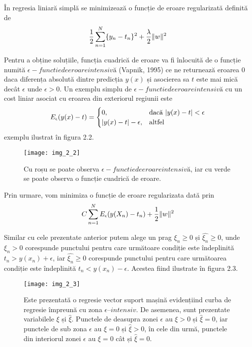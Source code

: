 În regresia liniară simplă se minimizează o funcție de eroare regularizată definită de
\begin{align}
	\frac{1}{2}\sum_{n=1}^{N}\{y_n-t_n\}^2+\frac{\lambda}{2}\lVert w\rVert^2
\end{align}

Pentru a obține soluțiile, funcția cuadrică de eroare va fi înlocuită de o funcție numită $\epsilon - functie de eroare intensivă$ (Vapnik, 1995) ce ne returnează eroarea 0 daca diferența absolută dintre predicția $y(x)$ și asocierea sa $t$ este mai mică decât $\epsilon$ unde $\epsilon > 0$. Un exemplu simplu de $\epsilon - functie de eroare intensivă$ cu un cost liniar asociat cu eroarea din exteriorul regiunii este
\begin{align}
	E_{\epsilon}(y(x) - t) = 
	\begin{cases}
	0,& \text{dacă } \lvert y(x) - t\rvert < \epsilon\\
	\lvert y(x) - t\rvert - \epsilon,              & \text{altfel}
	\end{cases}
\end{align}
exemplu ilustrat în figura 2.2.
\begin{figure}[!h]
	\centering
	\texttt{[image: img\_2\_2]}
	\caption{Cu roșu se poate observa $\epsilon - functie de eroare intensivă$, iar cu verde se poate observa o funcție cuadrică de eroare.}
\end{figure}
 
Prin urmare, vom minimiza o funcție de eroare regularizata dată prin
\begin{align}	
	C\sum_{n = 1}^{N}E_{\epsilon}(y(X_n) - t_n) + \frac{1}{2}\lVert w\rVert ^ 2
\end{align}

Similar cu cele prezentate anterior putem alege un prag $\xi_n \geq 0$ și $ \widehat{\xi_n} \geq 0$, unde $\xi_n > 0$ corespunde punctului pentru care următoare condiție este îndeplinită $t_n > y(x_n) + \epsilon$, iar  $ \widehat{\xi_n} \geq 0$ corespunde punctului pentru care următoarea condiție este îndeplinită $t_n < y(x_n) - \epsilon$. Acestea fiind ilustrate în figura 2.3.
\begin{figure}[!h]
	\centering
	\texttt{[image: img\_2\_3]}
	\caption{Este prezentată o regresie vector suport mașină evidențiind curba de regresie împreună cu zona $\epsilon – intensiv$. De asemenea, sunt prezentate variabilele $\xi$ și $ \widehat{\xi}$. Punctele de deasupra zonei $\epsilon$ au $\xi > 0$ și $ \widehat{\xi} = 0$, iar punctele de sub zona $\epsilon$ au $\xi = 0$ și $ \widehat{\xi} > 0$, în cele din urmă, punctele din interiorul zonei $\epsilon$ au $\xi = 0$ cât și $ \widehat{\xi} = 0$.}
\end{figure}

